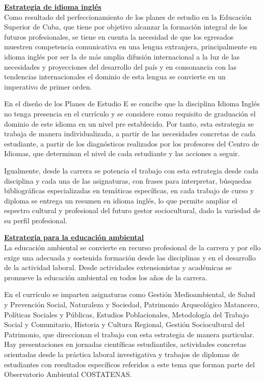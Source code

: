 \underline{\textbf{Estrategia de idioma inglés}}\\
Como resultado del perfeccionamiento de los planes de estudio en la Educación Superior de Cuba, que tiene por objetivo alcanzar la formación integral de los futuros profesionales, se tiene en cuenta la necesidad de que los egresados muestren competencia comunicativa en una lengua extranjera, principalmente en idioma inglés por ser la de más amplia difusión internacional a la luz de las necesidades y proyecciones del desarrollo del país y en consonancia con las tendencias internacionales el dominio de esta lengua se convierte en un imperativo de primer orden. 

En el diseño de los Planes de Estudio E se concibe que la disciplina Idioma Inglés no tenga presencia en el currículo y se considere como requisito de graduación el dominio de este idioma en un nivel pre establecido. Por tanto, esta estrategia se trabaja de manera individualizada, a partir de las necesidades concretas de cada estudiante, a partir de los diagnósticos realizados por los profesores del Centro de Idiomas, que determinan el nivel de cada estudiante y las acciones a seguir.

Igualmente, desde la carrera se potencia el trabajo con esta estrategia desde cada disciplina y cada una de las asignaturas, con frases para interpretar, búsquedas bibliográficas especializadas en temáticas específicas, en cada trabajo de curso y diploma se entrega un resumen en idioma inglés, lo que permite ampliar el espectro cultural y profesional del futuro gestor sociocultural, dado la variedad de su perfil profesional. 

\underline{\textbf{Estrategia para la educación ambiental}}\\
La educación ambiental se convierte en recurso profesional de la carrera y por ello exige una adecuada y sostenida formación desde las disciplinas y en el desarrollo de la actividad laboral. Desde actividades extensionistas y académicas se promueve la educación ambiental en todos los años de la carrera.

En el currículo se imparten asignaturas como Gestión Medioambiental, de Salud y Prevención Social, Naturaleza y Sociedad, Patrimonio Arqueológico Matancero, Políticas Sociales y Públicas, Estudios Poblacionales, Metodología del Trabajo Social y Comunitario, Historia y Cultura Regional, Gestión Sociocultural del Patrimonio, que direccionan el trabajo con esta estrategia de manera particular. Hay presentaciones en jornadas científicas estudiantiles, actividades concretas orientadas desde la práctica laboral investigativa y trabajos de diplomas de estudiantes con resultados específicos referidos a este tema que forman parte del Observatorio Ambiental COSTATENAS.

